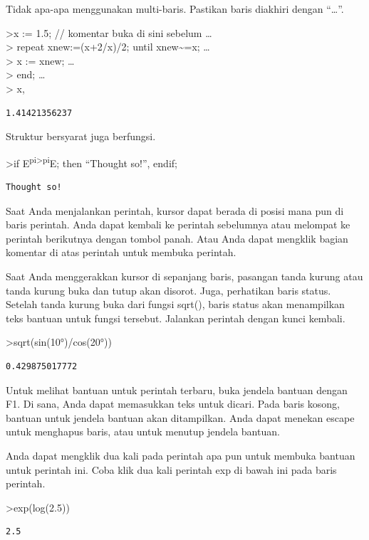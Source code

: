 \documentclass[
]{book}
\begin{document}
Tidak apa-apa menggunakan multi-baris. Pastikan baris diakhiri dengan ``\ldots{}''.

\textgreater x := 1.5; // komentar buka di sini sebelum \ldots{}\\
\textgreater{} repeat xnew:=(x+2/x)/2; until xnew\textasciitilde=x; \ldots{}\\
\textgreater{} x := xnew; \ldots{}\\
\textgreater{} end; \ldots{}\\
\textgreater{} x,

\begin{verbatim}
1.41421356237
\end{verbatim}

Struktur bersyarat juga berfungsi.

\textgreater if E\textsuperscript{pi\textgreater pi}E; then ``Thought so!'', endif;

\begin{verbatim}
Thought so!
\end{verbatim}

Saat Anda menjalankan perintah, kursor dapat berada di posisi mana pun di baris perintah. Anda dapat kembali ke perintah sebelumnya atau melompat ke perintah berikutnya dengan tombol panah. Atau Anda dapat mengklik bagian komentar di atas perintah untuk membuka perintah.

Saat Anda menggerakkan kursor di sepanjang baris, pasangan tanda kurung atau tanda kurung buka dan tutup akan disorot. Juga, perhatikan baris status. Setelah tanda kurung buka dari fungsi sqrt(), baris status akan menampilkan teks bantuan untuk fungsi tersebut. Jalankan perintah dengan kunci kembali.

\textgreater sqrt(sin(10°)/cos(20°))

\begin{verbatim}
0.429875017772
\end{verbatim}

Untuk melihat bantuan untuk perintah terbaru, buka jendela bantuan dengan F1. Di sana, Anda dapat memasukkan teks untuk dicari. Pada baris kosong, bantuan untuk jendela bantuan akan ditampilkan. Anda dapat menekan escape untuk menghapus baris, atau untuk menutup jendela bantuan.

Anda dapat mengklik dua kali pada perintah apa pun untuk membuka bantuan untuk perintah ini. Coba klik dua kali perintah exp di bawah ini pada baris perintah.

\textgreater exp(log(2.5))

\begin{verbatim}
2.5
\end{verbatim}
\end{document}
